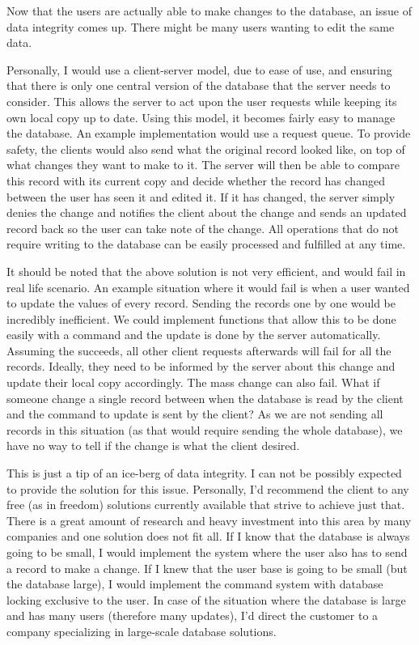 \documentclass{report}
\begin{document}
Now that the users are actually able to make changes to the database,
an issue of data integrity comes up. There might be many users wanting
to edit the same data.

Personally, I would use a client-server model, due to ease of use, and
ensuring that there is only one central version of the database that
the server needs to consider. This allows the server to act upon the
user requests while keeping its own local copy up to date. Using this
model, it becomes fairly easy to manage the database. An example
implementation would use a request queue. To provide safety, the
clients would also send what the original record looked like, on top
of what changes they want to make to it. The server will then be able
to compare this record with its current copy and decide whether the
record has changed between the user has seen it and edited it. If it
has changed, the server simply denies the change and notifies the
client about the change and sends an updated record back so the user
can take note of the change. All operations that do not require
writing to the database can be easily processed and fulfilled at any
time.

It should be noted that the above solution is not very efficient, and
would fail in real life scenario. An example situation where it would
fail is when a user wanted to update the values of every record.
Sending the records one by one would be incredibly inefficient. We
could implement functions that allow this to be done easily with a
command and the update is done by the server automatically. Assuming
the succeeds, all other client requests afterwards will fail for all
the records. Ideally, they need to be informed by the server about
this change and update their local copy accordingly. The mass change
can also fail. What if someone change a single record between when the
database is read by the client and the command to update is sent by
the client? As we are not sending all records in this situation (as
that would require sending the whole database), we have no way to tell
if the change is what the client desired.

This is just a tip of an ice-berg of data integrity. I can not be
possibly expected to provide the solution for this issue. Personally,
I'd recommend the client to any free (as in freedom) solutions
currently available that strive to achieve just that. There is a great
amount of research and heavy investment into this area by many
companies and one solution does not fit all. If I know that the
database is always going to be small, I would implement the system
where the user also has to send a record to make a change. If I knew
that the user base is going to be small (but the database large), I
would implement the command system with database locking exclusive to
the user. In case of the situation where the database is large and has
many users (therefore many updates), I'd direct the customer to a
company specializing in large-scale database solutions.
\end{document}
